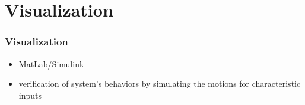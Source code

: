 \section{Visualization}

\begin{frame}[c]
	\frametitle{Visualization}
	\begin{itemize}
		\item{MatLab/Simulink}
		\vspace{0.5cm}
		\item{verification of system's behaviors by simulating the motions for characteristic inputs}
	\end{itemize}
\end{frame}
